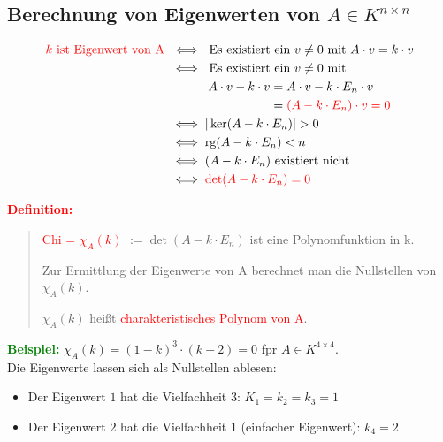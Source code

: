 \documentclass{article}
\newcommand{\red}[1]{\textcolor{red}{#1}}
\newcommand{\green}[1]{\textcolor{green}{#1}}
\newcommand{\ex}{\green{\textbf{Beispiel: }}}
\newcommand{\de}[1]{\red{\textbf{Definition: }}\begin{quote}#1\end{quote}}
\newcommand{\rg}{\text{rg}}
\begin{document}
\subsection{\texorpdfstring{Berechnung von Eigenwerten von $A \in K^{n \times n}$}{Berechnung von Eigenwerten}}

\begin{align*}
    \red{k \text{ ist Eigenwert von A }} &\iff \text{ Es existiert ein } v \ne 0 \text{ mit } A \cdot v = k \cdot v\\
    &\iff \text{ Es existiert ein } v \ne 0 \text{ mit }\\
    &\phantom{\iff  a} A \cdot v - k \cdot v = A \cdot v - k \cdot E_n \cdot v\\
    &\phantom{\iff  a A \cdot v - k \cdot v} = \red{(A - k \cdot E_n) \cdot v = 0}\\
    &\iff |\ker(A - k \cdot E_n)| > 0\\
    &\iff \rg(A - k \cdot E_n) < n\\
    &\iff (A - k \cdot E_n) \text{ existiert nicht}\\
    &\iff \red{\det(A - k \cdot E_n) = 0}
\end{align*}

\newpage
\de{
    \red{Chi = $\chi_A(k)$} $:= \det(A - k \cdot E_n)$ ist eine Polynomfunktion in k. 

    Zur Ermittlung der Eigenwerte von A berechnet man die Nullstellen von $\chi_A(k)$.

    $\chi_A(k)$ heißt \red{charakteristisches Polynom von A}.
}

\ex $\chi_A(k) = (1-k)^3 \cdot (k-2) = 0$ fpr $A \in K^{4 \times 4}$.\\
Die Eigenwerte lassen sich als Nullstellen ablesen:
\begin{itemize}
    \item Der Eigenwert $1$ hat die Vielfachheit $3$: $K_1 = k_2 = k_3 = 1$
    \item Der Eigenwert $2$ hat die Vielfachheit $1$ (einfacher Eigenwert): $k_4 = 2$
\end{itemize}
\end{document}
